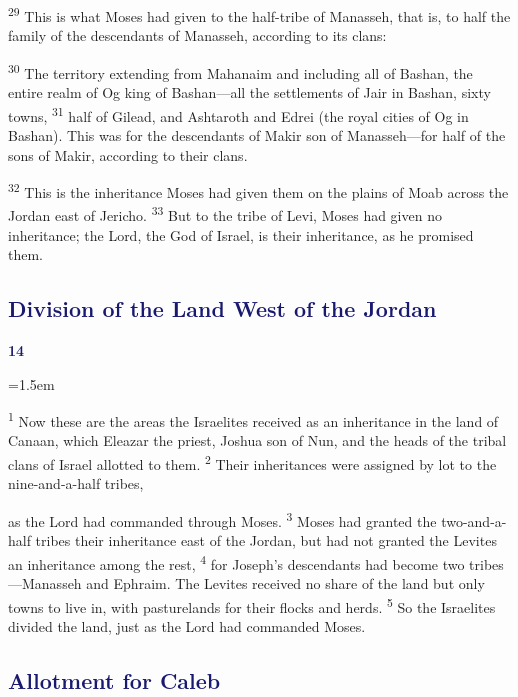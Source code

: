 \documentclass[12pt,twoside]{article}
\newcommand{\vs}[1]{\textsuperscript{#1}}
\newcommand{\chapterWithBigIndent}[2]{%
  \noindent
  \begin{minipage}[t]{1cm}
    \vspace{-0.4\baselineskip}
    {\textcolor{MidnightBlue}{\fontsize{40pt}{48pt}\selectfont \textbf{#1}}}
  \end{minipage}%
  \hspace{0.9cm}%
  \begin{minipage}[t]{\dimexpr\linewidth - 1.5cm - 0.3cm\relax}
    \hangindent=1.5em
    \hangafter=3
    #2
    \vspace{0.05cm}
  \end{minipage}
}
\begin{document}
\noindent \vs{29} This is what Moses had given to the half-tribe of Manasseh, that is, to half the family of the descendants of Manasseh, according to its clans:\vspace{0.3cm}

\begin{adjustwidth}{0.5cm}{0cm}
  \vs{30} The territory extending from Mahanaim and including all of Bashan, the entire realm of Og king of Bashan---all the settlements of Jair in Bashan, sixty towns,
  \vs{31} half of Gilead, and Ashtaroth and Edrei (the royal cities of Og in Bashan). This was for the descendants of Makir son of Manasseh---for half of the sons of Makir, according to their clans.\vspace{0.3cm}
\end{adjustwidth}

\vs{32} This is the inheritance Moses had given them on the plains of Moab across the Jordan east of Jericho.
\vs{33} But to the tribe of Levi, Moses had given no inheritance; the Lord, the God of Israel, is their inheritance, as he promised them.

\subsection*{\textcolor{MidnightBlue}{\textbf{Division of the Land West of the Jordan}}}

\chapterWithBigIndent{14}{
  \vs{1} Now these are the areas the Israelites received as an inheritance in the land of Canaan, which Eleazar the priest, Joshua son of Nun, and the heads of the tribal clans of Israel allotted to them.
  \vs{2} Their inheritances were assigned by lot to the nine-and-a-half tribes,\vspace{-0.6cm}
}

\noindent as the Lord had commanded through Moses.
\vs{3} Moses had granted the two-and-a-half tribes their inheritance east of the Jordan, but had not granted the Levites an inheritance among the rest,
\vs{4} for Joseph's descendants had become two tribes---Manasseh and Ephraim. The Levites received no share of the land but only towns to live in, with pasturelands for their flocks and herds.
\vs{5} So the Israelites divided the land, just as the Lord had commanded Moses.

\subsection*{\textcolor{MidnightBlue}{\textbf{Allotment for Caleb}}}
\end{document}

